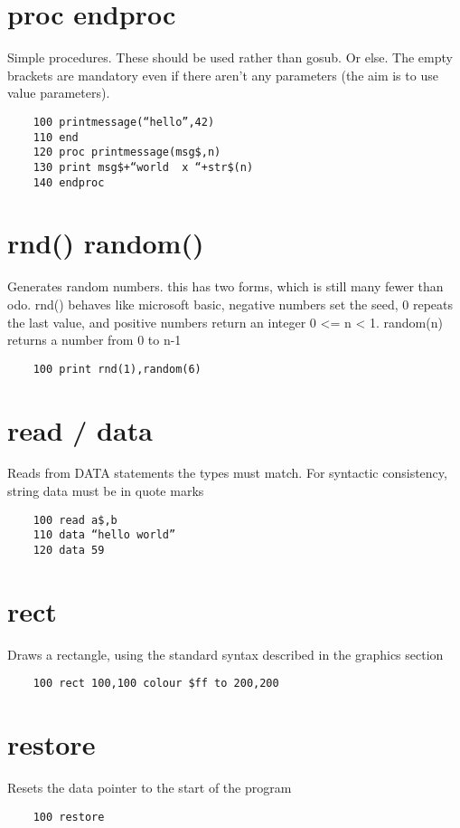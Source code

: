 \section*{proc endproc}
Simple procedures. These should be used rather than gosub. Or else.  The empty brackets are mandatory even if there aren’t any parameters (the aim is to use value parameters).
\example{}
\begin{verbatim}
	100 printmessage(“hello”,42)
	110 end
	120 proc printmessage(msg$,n)
	130 print msg$+“world  x “+str$(n)
	140 endproc
\end{verbatim}

\section*{rnd() random()}
Generates random numbers. this has two forms, which is still many fewer than odo. rnd() behaves like microsoft basic, negative numbers set the seed,  0 repeats the last value, and positive numbers return an integer 0 <= n < 1. random(n) returns a number from 0 to n-1
\example{}
\begin{verbatim}
	100 print rnd(1),random(6)
\end{verbatim}

\section*{read / data}
Reads from DATA statements the types must match. For syntactic consistency, string data must be in quote marks
\example{}
\begin{verbatim}
	100 read a$,b
	110 data “hello world”
	120 data 59
\end{verbatim}

\section*{rect}
Draws a rectangle, using the standard syntax described in the graphics section
\example{}
\begin{verbatim}
	100 rect 100,100 colour $ff to 200,200
\end{verbatim}

\section*{restore}
Resets the data pointer to the start of the program
\example{}
\begin{verbatim}
	100 restore
\end{verbatim}

